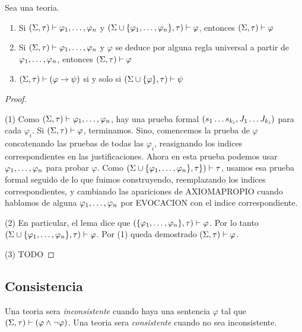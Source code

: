 \begin{lemma}
  Sea \forder una teoria. \begin{enumerate}
    \item Si $\forder\proves\succession{\varphi}{1}{n}$ y $(\Sigma\cup\{\succession{\varphi}{1}{n}\},\tau)\proves\varphi$, entonces $\forder\proves\varphi$
    \item Si $\forder\proves\succession{\varphi}{1}{n}$ y $\varphi$ se deduce por alguna regla universal a partir de $\succession{\varphi}{1}{n}$, entonces $\forder\proves\varphi$
    \item $\forder\proves(\varphi\rightarrow\psi)$ si y solo si $(\Sigma\cup\{\varphi\},\tau)\proves\psi$
  \end{enumerate}
\end{lemma}
\begin{proof}
  $ $

  (1) Como $\forder\proves\succession{\varphi}{1}{n}$, hay una prueba formal $(\succession[]{s}{1}{k_i},\succession[]{J}{1}{k_i})$ para cada $\varphi_i$.
  Si $\forder\proves\varphi$, terminamos. Sino, comencemos la prueba de $\varphi$ concatenando las pruebas de todas las $\varphi_i$, reasignando los indices correspondientes 
  en las justificaciones. Ahora en esta prueba podemos usar $\succession{\varphi}{1}{n}$ para probar $\varphi$. Como $(\Sigma\cup\{\succession{\varphi}{1}{n}\},\tau\})\proves\tau$, usamos 
  esa prueba formal seguido de lo que fuimos construyendo, reemplazando los indices correspondientes, y cambiando las apariciones de AXIOMAPROPIO cuando hablamos de alguna $\succession{\varphi}{1}{n}$
  por EVOCACION con el indice correspondiente.
  
  (2) En particular, el lema dice que $(\{\succession{\varphi}{1}{n}\},\tau)\proves\varphi$. Por lo tanto $(\Sigma\cup\{\succession{\varphi}{1}{n}\},\tau)\proves\varphi$. Por (1) queda demostrado
  $\forder\proves\varphi$.

  (3) TODO
\end{proof}

\subsection{Consistencia}
\begin{definition}
  Una teoria \forder sera \emph{inconsistente} cuando haya una sentencia $\varphi$ tal que $\forder\proves(\varphi\land\neg\varphi)$.
  Una teoria \forder sera \emph{consistente} cuando no sea inconsistente.
\end{definition}

